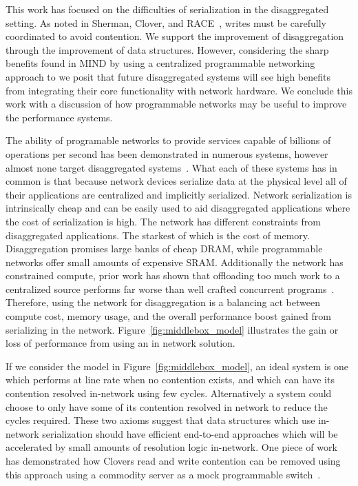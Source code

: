 This work has focused on the difficulties of serialization in the disaggregated
setting. As noted in Sherman, Clover, and
RACE~\cite{sherman,clover,one-sided-hash}, writes must be carefully coordinated
to avoid contention. We support the improvement of disaggregation through the
improvement of data structures. However, considering the sharp benefits found in
MIND by using a centralized programmable networking approach to we posit that
future disaggregated systems will see high benefits from integrating their core
functionality with network hardware. We conclude this work with a discussion of
how programmable networks may be useful to improve the performance systems.

The ability of programable networks to provide services capable of billions of
operations per second has been demonstrated in numerous systems, however almost
none target disaggregated
systems~\cite{netlock,netchain,netcache,netkv,kv-direct,mind}. What each of
these systems has in common is that because network devices serialize data at
the physical level all of their applications are centralized and implicitly
serialized. Network serialization is intrinsically cheap and can be easily used
to aid disaggregated applications where the cost of serialization is high.  The
network has different constraints from disaggregated applications. The starkest
of which is the cost of memory. Disaggregation promises large banks of cheap
DRAM, while programmable networks offer small amounts of expensive SRAM.
Additionally the network has constrained compute, prior work has shown that
offloading too much work to a centralized source performs far worse than well
crafted concurrent programs~\cite{near-memory-structs}. Therefore, using the
network for disaggregation is a balancing act between compute cost, memory
usage, and the overall performance boost gained from serializing in the network.
Figure~\ref{fig:middlebox_model} illustrates the gain or loss of performance
from using an in network solution.

If we consider the model in Figure~\ref{fig:middlebox_model}, an ideal system is
one which performs at line rate when no contention exists, and which can have
its contention resolved in-network using few cycles. Alternatively a system
could choose to only have some of its contention resolved in network to reduce
the cycles required. These two axioms suggest that data structures which use
in-network serialization should have efficient end-to-end approaches which will
be accelerated by small amounts of resolution logic in-network. One piece of
work has demonstrated how Clovers read and write contention can be removed using
this approach using a commodity server as a mock programmable
switch~\cite{Grant2021InContRes}.

